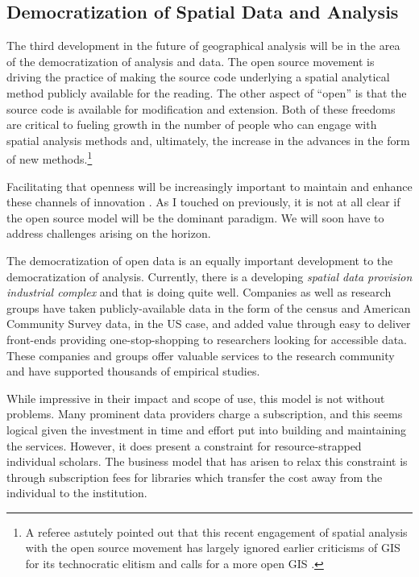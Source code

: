 \documentclass[11pt]{article}
\begin{document}
\subsection{Democratization of Spatial Data and Analysis}
\label{sec:org3bf5ccc}
The third development in the future of geographical analysis will be in the area of
the democratization of analysis and data. The open source movement is driving the practice of making the source code underlying a spatial analytical method publicly
available for the reading. The other aspect of ``open'' is that the source code
is available for modification and extension. Both of these freedoms are critical
to fueling growth in the number of people who can engage with spatial analysis
methods and, ultimately, the increase in the advances in the form of new
methods.\footnote{A referee astutely pointed out that 
this recent engagement of spatial
analysis with the open source movement has largely ignored earlier criticisms of
GIS for its technocratic elitism\cite{obermeyer_1995} and calls for a
more open GIS \cite{pickles_1995}.}


Facilitating that openness will be increasingly important to maintain and
enhance these channels of innovation \cite{rey_show_2009}. As I touched on
previously, it is not at all clear if the open source model will be the dominant
paradigm. We will soon have to address challenges arising on the horizon.

The democratization of open data is an equally important development to the
democratization of analysis. Currently, there is a developing \emph{spatial
data provision industrial complex} and that is doing quite well. Companies
\cite{ncdb_2018} as well as research groups \cite{ipums_2018,Logan_2014} have
taken publicly-available data in the form of the census and American Community
Survey data, in the US case, and added value through easy to deliver front-ends
providing one-stop-shopping to researchers looking for accessible data. These
companies and groups offer valuable services to the research community and
have supported thousands of empirical studies.

While impressive in their impact and scope of use, this model is not without
problems. Many prominent data providers charge a subscription, and this seems
logical given the investment in time and effort put into building and
maintaining the services. However, it does present a constraint for
resource-strapped individual scholars. The business model that has arisen to
relax this constraint is through subscription fees for libraries which transfer
the cost away from the individual to the institution.
\end{document}
